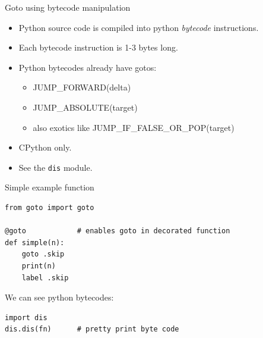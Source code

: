 \documentclass{beamer}
\begin{document}
\begin{frame}[fragile]{Goto using bytecode manipulation}

\begin{itemize}
\item Python source code is compiled into python \emph{bytecode} instructions.

\item Each bytecode instruction is 1-3 bytes long.
\item Python bytecodes already have gotos:

\begin{itemize}
\item JUMP\_FORWARD(delta)
\item JUMP\_ABSOLUTE(target)
\item also exotics like JUMP\_IF\_FALSE\_OR\_POP(target)
\end{itemize}
\item CPython only.
\item See the \verb!dis! module.
\end{itemize}
\end{frame}

\begin{frame}[fragile]{Simple example function}



\begin{verbatim}
from goto import goto

@goto            # enables goto in decorated function
def simple(n):
    goto .skip
    print(n)
    label .skip
\end{verbatim}

We can see python bytecodes:

\begin{verbatim}
import dis
dis.dis(fn)      # pretty print byte code
\end{verbatim}

\end{frame}
\end{document}
